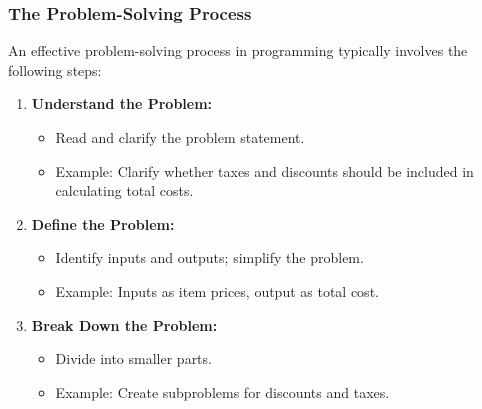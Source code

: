 \documentclass{beamer}
\begin{document}
\begin{frame}[fragile]
    \frametitle{The Problem-Solving Process}
    An effective problem-solving process in programming typically involves the following steps:

    \begin{enumerate}
        \item \textbf{Understand the Problem:}
            \begin{itemize}
                \item Read and clarify the problem statement.
                \item Example: Clarify whether taxes and discounts should be included in calculating total costs.
            \end{itemize}

        \item \textbf{Define the Problem:}
            \begin{itemize}
                \item Identify inputs and outputs; simplify the problem.
                \item Example: Inputs as item prices, output as total cost.
            \end{itemize}

        \item \textbf{Break Down the Problem:}
            \begin{itemize}
                \item Divide into smaller parts.
                \item Example: Create subproblems for discounts and taxes.
            \end{itemize}
    \end{enumerate}
\end{frame}
\end{document}
